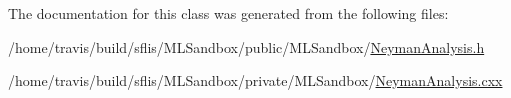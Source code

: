 The documentation for this class was generated from the following files\-:\begin{DoxyCompactItemize}
\item 
/home/travis/build/sflis/\-M\-L\-Sandbox/public/\-M\-L\-Sandbox/\hyperlink{NeymanAnalysis_8h}{Neyman\-Analysis.\-h}\item 
/home/travis/build/sflis/\-M\-L\-Sandbox/private/\-M\-L\-Sandbox/\hyperlink{MLSandbox_2NeymanAnalysis_8cxx}{Neyman\-Analysis.\-cxx}\end{DoxyCompactItemize}
